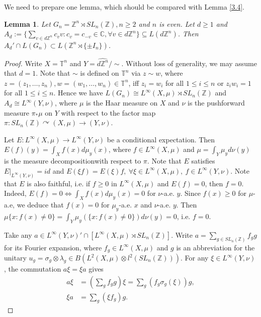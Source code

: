 \documentclass[12pt]{amsart}
\newtheorem{lem}[theorem]{Lemma}
\theoremstyle{definition}
\theoremstyle{remark}
\begin{document}
We need to prepare one lemma, which should be compared with Lemma \ref{3.4}.

\begin{lem}\label{3.7}
Let $G_{n}=\mathbb{Z}^n \rtimes SL_n(\mathbb{Z}), n\ge 2$ and $n$ is even. Let $d\ge1$ and $A_{d}:=\{\sum_{v\in d\mathbb{Z}^{n}}c_{v}v:c_{v}=c_{-v}\in\mathbb{C},\forall v\in d\mathbb{Z}^{n}\}\subseteq L(d\mathbb{Z}^n)$. Then $A_{d}' \cap L(G_{n}) \subset L(\mathbb{Z}^n \rtimes \{\pm I_{n}\})$.
\end{lem}
\begin{proof}
Write $X = \mathbb{T}^n$ and $Y = \widehat{d\mathbb{Z}^{n}}/{\sim}$. Without loss of generality, we may assume that $d=1$. Note that $\sim$ is defined on $\mathbb{T}^n$ via $z\sim w$, where $z=(z_1,\ldots,z_n), w=(w_1,\ldots ,w_n)\in \mathbb{T}^n$, iff $z_i=w_i$ for all $1\le i \le n$ or $z_iw_i=1$  for all $1\le i \le n$. Hence we have $L(G_n) \cong L^{\infty}(X, \mu) \rtimes SL_n(\mathbb{Z})$ and $A_d \cong L^{\infty}(Y, \nu) $, where $\mu$ is the Haar measure on $X$ and $\nu$ is the pushforward measure $\pi_*\mu$ on $Y$ with respect to the factor map  $\pi : SL_n(\mathbb{Z})\curvearrowright (X,\mu) \rightarrow (Y,\nu)$. 

Let $E:L^{\infty}(X, \mu) \rightarrow L^{\infty}(Y, \nu)$ be a conditional expectation. Then $E(f)(y) = \int_X f(x)d\mu_{y}(x)$, where $f\in L^{\infty}(X, \mu)$ and $\mu=\int_Y \mu_{y}d\nu(y)$ is the measure decompositionwith respect to $\pi$.
Note that $E$ satisfies $E|_{L^{\infty}(Y,\nu)} = id$ and $E(\xi f) = E(\xi)f,~\forall \xi \in L^{\infty}(X, \mu),~f \in L^{\infty}(Y, \nu)$. Note that $E$ is also faithful, i.e. if $f\ge0$ in $ L^{\infty}(X, \mu)$ and $E(f)=0$, then $f=0$. 
Indeed, $E(f) = 0 \Leftrightarrow \int_X f(x)d\mu_y(x)= 0$ for $\nu$-a.e. $y$. Since $f(x)\ge 0$ for $\mu$-a.e, we deduce that $f(x) = 0$ for $\mu_{y}$-a.e. $x$ and $\nu$-a.e. $y$. Then $\mu\{x:f(x)\ne 0\} = \int_Y \mu_{y}(\{x:f(x)\ne 0\})d\nu(y) = 0$, i.e. $f=0$. 

Take any $a \in L^{\infty}(Y, \nu)' \cap [L^{\infty}(X,\mu)\rtimes SL_{n}(\mathbb{Z})]$. Write  $a=\sum_{g\in SL_{n}(\mathbb{Z})}f_{g}g$ for its Fourier expansion, where $f_g \in L^{\infty}(X, \mu)$ and $g$ is an abbreviation for the unitary $u_g = \sigma_{g}\otimes \lambda_g \in B(L^2(X,\mu)\otimes l^2(SL_n(\mathbb{Z})))$. For any $\xi\in  L^{\infty}(Y, \nu)$, the commutation $a\xi = \xi a$ gives
\begin{align*}
    a\xi&=(\sum\limits_{g}f_g g)\xi=\sum\limits_{g}(f_g \sigma_{g}(\xi))g,\\
    \xi a&=\sum\limits_{g}( \xi f_g )g.
\end{align*}


\end{proof}
\end{document}
